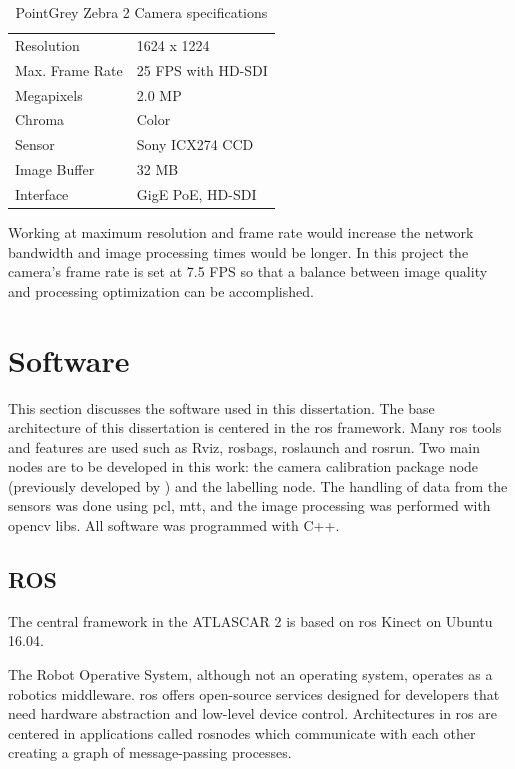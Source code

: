 \begin{table}[!h]
	\centering
	\caption{PointGrey Zebra 2 Camera specifications}
	\label{tab: pointgreyspecs}
	\begin{tabular}{ll}
		
		\hline
		Resolution & 1624 x 1224\\
		Max. Frame Rate & 25 FPS with HD-SDI \\
		Megapixels & 2.0 MP \\
		Chroma & Color\\
		Sensor & Sony ICX274 CCD \\
		Image Buffer &	32 MB\\
		Interface &	GigE PoE, HD-SDI\\
		
		\hline
	\end{tabular}
\end{table}

Working at maximum resolution and frame rate would increase the network bandwidth and image processing times would be longer. In this project the camera's frame rate is set at 7.5 FPS so that a balance between image quality and processing optimization can be accomplished.


\section{Software}

This section discusses the software used in this dissertation. The base architecture of this dissertation is centered in the \gls{ros} framework. Many \gls{ros} tools and features are used such as Rviz, rosbags, roslaunch and rosrun. Two main nodes are to be developed in this work: the camera calibration package node (previously developed by \cite{VieiradaSilva2016}) and the labelling node. The handling of data from the sensors was done using \gls{pcl}, \gls{mtt}, 
and the image processing was performed with \gls{opencv} libs. All software was programmed with C++.

\subsection{ROS}
The central framework in the ATLASCAR 2 is based on \gls{ros} Kinect on Ubuntu 16.04.

The Robot Operative System, although not an operating system, operates as a robotics middleware. \gls{ros} offers open-source services designed for developers that need hardware abstraction and low-level device control. Architectures in \gls{ros} are centered in applications called rosnodes which communicate with each other creating a graph of  message-passing processes. 

